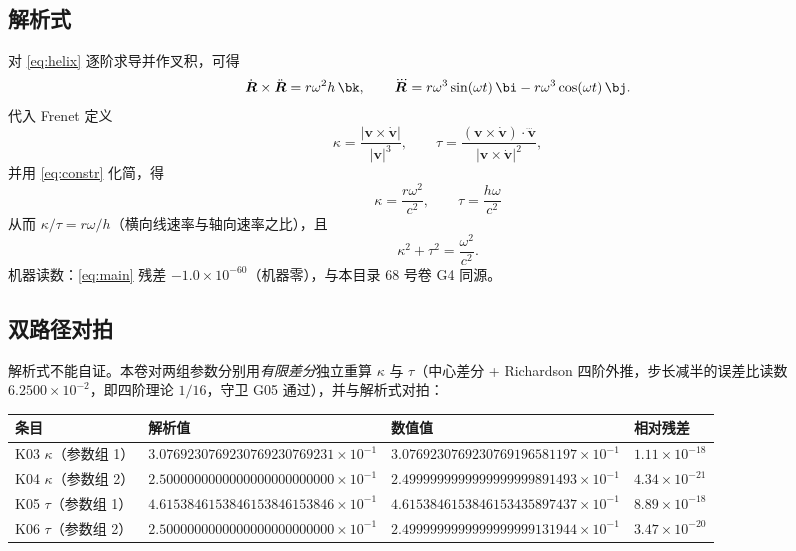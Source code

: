 \documentclass[UTF8,fontset=fandol,11pt]{ctexart}
\newcommand{\bx}{\boldsymbol}
\begin{document}
\subsection{解析式}
对 \eqref{eq:helix} 逐阶求导并作叉积，可得
\begin{equation}
  \dot{\bx R}\times\ddot{\bx R}=r\omega^2 h\,\bk ,\qquad
  \dddot{\bx R}=r\omega^3\sin(\omega t)\,\bi-r\omega^3\cos(\omega t)\,\bj .
\end{equation}
代入 Frenet 定义
\begin{equation}
  \kappa=\frac{|\bx v\times\dot{\bx v}|}{|\bx v|^3},\qquad
  \tau=\frac{(\bx v\times\dot{\bx v})\cdot\dddot{\bx v}}{|\bx v\times\dot{\bx v}|^2},
\end{equation}
并用 \eqref{eq:constr} 化简，得
\begin{equation}
  \boxed{\ \kappa=\frac{r\omega^2}{c^2},\qquad \tau=\frac{h\omega}{c^2}\ }
  \label{eq:kt}
\end{equation}
从而 $\kappa/\tau=r\omega/h$（横向线速率与轴向速率之比），且
\begin{equation}
  \kappa^2+\tau^2=\frac{\omega^2}{c^2} .
  \label{eq:main}
\end{equation}
机器读数：\eqref{eq:main} 残差 $-1.0\times10^{-60}$（机器零），与本目录 68 号卷 G4 同源。

\subsection{双路径对拍}
解析式不能自证。本卷对两组参数分别用\emph{有限差分}独立重算 $\kappa$ 与 $\tau$（中心差分 + Richardson 四阶外推，步长减半的误差比读数 $6.2500\times10^{-2}$，即四阶理论 $1/16$，守卫 G05 通过），并与解析式对拍：

\begin{center}
\begin{tabular}{llll}
\toprule
条目 & 解析值 & 数值值 & 相对残差 \\
\midrule
K03 $\kappa$（参数组 1） & $3.0769230769230769230769231\times10^{-1}$ & $3.0769230769230769196581197\times10^{-1}$ & $1.11\times10^{-18}$ \\
K04 $\kappa$（参数组 2） & $2.5000000000000000000000000\times10^{-1}$ & $2.4999999999999999999891493\times10^{-1}$ & $4.34\times10^{-21}$ \\
K05 $\tau$（参数组 1） & $4.6153846153846153846153846\times10^{-1}$ & $4.6153846153846153435897437\times10^{-1}$ & $8.89\times10^{-18}$ \\
K06 $\tau$（参数组 2） & $2.5000000000000000000000000\times10^{-1}$ & $2.4999999999999999999131944\times10^{-1}$ & $3.47\times10^{-20}$ \\
\bottomrule
\end{tabular}
\end{center}
\end{document}
